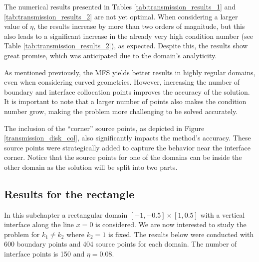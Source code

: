 The numerical results presented in Tables \ref{tab:transmission_results_1} and \ref{tab:transmission_results_2} are not yet optimal. When considering a larger value of \(\eta\), the results increase by more than two orders of magnitude, but this also leads to a significant increase in the already very high condition number (see Table \ref{tab:transmission_results_2}), as expected. Despite this, the results show great promise, which was anticipated due to the domain's analyticity.

As mentioned previously, the \ac{MFS} yields better results in highly regular domains, even when considering curved geometries. However, increasing the number of boundary and interface collocation points improves the accuracy of the solution. It is important to note that a larger number of points also makes the condition number grow, making the problem more challenging to be solved accurately.

The inclusion of the ``corner'' source points, as depicted in Figure \ref{transmission_disk_col}, also significantly impacts the method's accuracy. These source points were strategically added to capture the behavior near the interface corner. Notice that the source points for one of the domains can be inside the other domain as the solution will be split into two parts.

\subsection{Results for the rectangle}

In this subchapter a rectangular domain \([-1, -0.5] \times [1, 0.5]\) with a vertical interface along the line \(x=0\) is considered. We are now interested to study the problem for \(k_1 \neq k_2\) where \(k_2=1\) is fixed. The results below were conducted with 600 boundary points and 404 source points for each domain. The number of interface points is 150 and \(\eta=0.08\).

